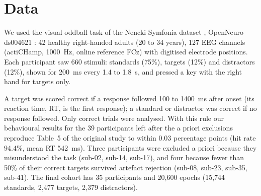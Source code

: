 \section{Data}
\label{ch:data}

We used the visual oddball task of the Nencki-Symfonia dataset \citep{dzianok2022}, OpenNeuro ds004621 \citep{dzianok2022data}: 42 healthy right-handed adults (20 to 34 years), 127 EEG channels (actiCHamp, 1000~Hz, online reference FCz) with digitised electrode positions. Each participant saw 660 stimuli: standards (75\%), targets (12\%) and distractors (12\%), shown for 200~ms every 1.4 to 1.8~s, and pressed a key with the right hand for targets only.

A target was scored correct if a response followed 100 to 1400~ms after onset (its reaction time, RT, is the first response); a standard or distractor was correct if no response followed. Only correct trials were analysed. With this rule our behavioural results for the 39 participants left after the a priori exclusions reproduce Table~5 of the original study to within 0.03 percentage points (hit rate 94.4\%, mean RT 542~ms). Three participants were excluded a priori because they misunderstood the task (sub-02, sub-14, sub-17), and four because fewer than 50\% of their correct targets survived artefact rejection (sub-08, sub-23, sub-35, sub-41). The final cohort has 35 participants and 20,600 epochs (15,744 standards, 2,477 targets, 2,379 distractors).
